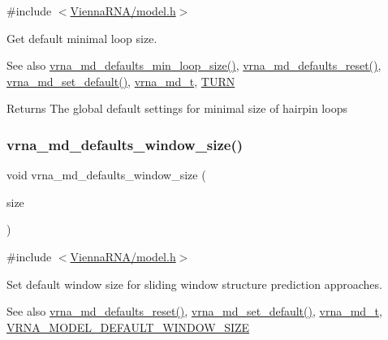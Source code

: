 {\ttfamily \#include $<$\mbox{\hyperlink{model_8h}{Vienna\+R\+N\+A/model.\+h}}$>$}



Get default minimal loop size. 

\begin{DoxySeeAlso}{See also}
\mbox{\hyperlink{group__model__details_gac152f1e78c1058a10261022c8dfda0f7}{vrna\+\_\+md\+\_\+defaults\+\_\+min\+\_\+loop\+\_\+size()}}, \mbox{\hyperlink{group__model__details_ga70834424cf804d149937de89f80ceb45}{vrna\+\_\+md\+\_\+defaults\+\_\+reset()}}, \mbox{\hyperlink{group__model__details_ga8ac6ff84936282436f822644bf841f66}{vrna\+\_\+md\+\_\+set\+\_\+default()}}, \mbox{\hyperlink{group__model__details_ga1f8a10e12a0a1915f2a4eff0b28ea17c}{vrna\+\_\+md\+\_\+t}}, \mbox{\hyperlink{energy__const_8h_ae646250fd59311356c7e5722a81c3a96}{T\+U\+RN}} 
\end{DoxySeeAlso}
\begin{DoxyReturn}{Returns}
The global default settings for minimal size of hairpin loops 
\end{DoxyReturn}
\mbox{\label{group__model__details_ga7b802ce0e8c3181bf5cb580de6d5b26a}} 
\subsubsection{\texorpdfstring{vrna\+\_\+md\+\_\+defaults\+\_\+window\+\_\+size()}{vrna\_md\_defaults\_window\_size()}}
{\footnotesize\ttfamily void vrna\+\_\+md\+\_\+defaults\+\_\+window\+\_\+size (\begin{DoxyParamCaption}\item[{int}]{size }\end{DoxyParamCaption})}



{\ttfamily \#include $<$\mbox{\hyperlink{model_8h}{Vienna\+R\+N\+A/model.\+h}}$>$}



Set default window size for sliding window structure prediction approaches. 

\begin{DoxySeeAlso}{See also}
\mbox{\hyperlink{group__model__details_ga70834424cf804d149937de89f80ceb45}{vrna\+\_\+md\+\_\+defaults\+\_\+reset()}}, \mbox{\hyperlink{group__model__details_ga8ac6ff84936282436f822644bf841f66}{vrna\+\_\+md\+\_\+set\+\_\+default()}}, \mbox{\hyperlink{group__model__details_ga1f8a10e12a0a1915f2a4eff0b28ea17c}{vrna\+\_\+md\+\_\+t}}, \mbox{\hyperlink{group__model__details_ga8de04a9cb57e811e313b0f9f207f6bdb}{V\+R\+N\+A\+\_\+\+M\+O\+D\+E\+L\+\_\+\+D\+E\+F\+A\+U\+L\+T\+\_\+\+W\+I\+N\+D\+O\+W\+\_\+\+S\+I\+ZE}} 
\end{DoxySeeAlso}

